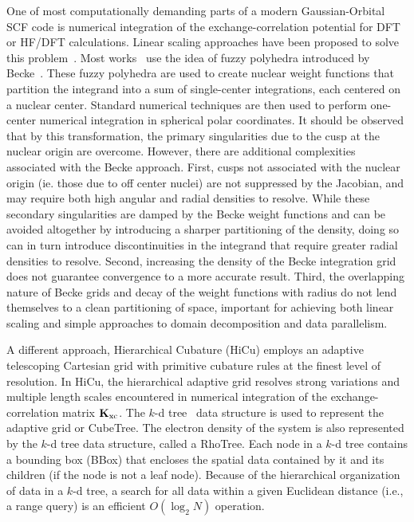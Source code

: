 \commentoutA{\documentclass[prb,aps,twocolumn,twocolumngrid]{revtex4}}
\newcommand{\Kxc}{{\bf K}_{\mathrm{xc}}}
\begin{document}
One of most computationally demanding parts of a modern Gaussian-Orbital SCF code is numerical integration of
the exchange-correlation potential for DFT or HF/DFT calculations. Linear scaling approaches have been proposed
to solve this problem~\cite{Jorda95,RStratmann96,CGuerra98,MChallacombe00A}.
Most works~\cite{Furlani_00v128,Jorda95,RStratmann96,Scuseria99} use the idea of
fuzzy polyhedra introduced by Becke~\cite{Becke88}.  These fuzzy
polyhedra are used to create nuclear weight functions that partition the integrand
into a sum of single-center integrations, each centered on a nuclear center.  
Standard numerical techniques are then used to perform one-center numerical integration in spherical polar
coordinates.  It should be observed that by this transformation, the
primary singularities due to the cusp at the nuclear origin are overcome.
However, there are additional complexities associated with the Becke approach.
First,  cusps not associated with the nuclear origin (ie. those due to off center nuclei) are not 
suppressed by the Jacobian, and may require both high angular and radial densities to 
resolve. While these secondary singularities are damped by the Becke weight functions
and can be avoided altogether by introducing a sharper partitioning of the density, 
doing so can in turn introduce discontinuities in the integrand that require greater radial 
densities to resolve.  Second, increasing the density of the Becke 
integration grid does not guarantee convergence to a more accurate result.  
Third, the overlapping nature of Becke grids and decay of the weight functions with 
radius do not lend themselves to a clean partitioning of space, important for achieving both linear 
scaling and simple approaches to domain decomposition and data parallelism.

A different approach, Hierarchical Cubature (HiCu) employs an adaptive 
telescoping Cartesian grid with primitive cubature rules at the finest level of 
resolution\cite{MChallacombe00A}.  In HiCu, the hierarchical adaptive grid resolves 
strong variations and multiple length scales encountered in numerical integration of the
exchange-correlation matrix $\Kxc$.  The $k$-d
tree~\cite{Bentley79,Bentley80,Gaede98} data structure is used to
represent the adaptive grid or CubeTree. The electron density of the
system is also represented by the $k$-d tree data structure, called a
RhoTree.  Each node in a $k$-d tree contains a bounding box (BBox)
that encloses the spatial data contained by it and its children (if
the node is not a leaf node).  Because of the hierarchical
organization of data in a $k$-d tree, a search for all data within a
given Euclidean distance (i.e., a range query) is an efficient
$O(\log_{2}N)$ operation.
\end{document}
